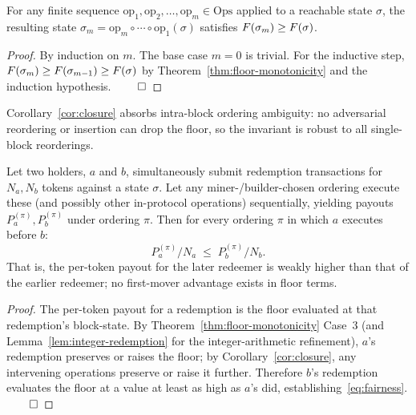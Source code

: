 \begin{corollary}
\label{cor:closure}
For any finite sequence $\text{op}_1, \text{op}_2, \ldots, \text{op}_m \in \mathrm{Ops}$ applied to a reachable state $\sigma$, the resulting state $\sigma_m = \text{op}_m \circ \cdots \circ \text{op}_1(\sigma)$ satisfies $F(\sigma_m) \geq F(\sigma)$.
\end{corollary}

\begin{proof}
By induction on $m$. The base case $m = 0$ is trivial. For the inductive step, $F(\sigma_m) \geq F(\sigma_{m-1}) \geq F(\sigma)$ by Theorem~\ref{thm:floor-monotonicity} and the induction hypothesis. $\qed$
\end{proof}

Corollary~\ref{cor:closure} absorbs intra-block ordering ambiguity: no adversarial reordering or insertion can drop the floor, so the invariant is robust to all single-block reorderings.

\begin{theorem}
\label{thm:redemption-fairness}
Let two holders, $a$ and $b$, simultaneously submit redemption transactions for $N_a, N_b$ tokens against a state $\sigma$. Let any miner-/builder-chosen ordering execute these (and possibly other in-protocol operations) sequentially, yielding payouts $P_a^{(\pi)}, P_b^{(\pi)}$ under ordering $\pi$. Then for every ordering $\pi$ in which $a$ executes before $b$:
\begin{equation}
P_a^{(\pi)} / N_a \;\leq\; P_b^{(\pi)} / N_b.
\label{eq:fairness}
\end{equation}
That is, the per-token payout for the later redeemer is weakly higher than that of the earlier redeemer; no first-mover advantage exists in floor terms.
\end{theorem}

\begin{proof}
The per-token payout for a redemption is the floor evaluated at that redemption's block-state. By Theorem~\ref{thm:floor-monotonicity} Case~3 (and Lemma~\ref{lem:integer-redemption} for the integer-arithmetic refinement), $a$'s redemption preserves or raises the floor; by Corollary~\ref{cor:closure}, any intervening operations preserve or raise it further. Therefore $b$'s redemption evaluates the floor at a value at least as high as $a$'s did, establishing~\eqref{eq:fairness}. $\qed$
\end{proof}

